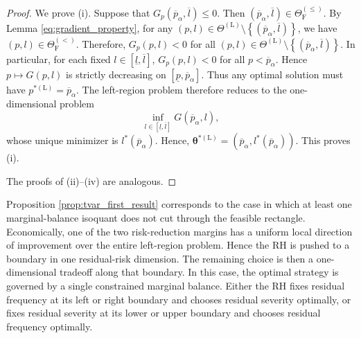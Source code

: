 \documentclass[a4paper,12pt]{article}
\begin{document}
\begin{proof}
We prove (i). Suppose that $G_p\left(\overline{p}_{\alpha},\overline{l}\right)\leq 0$. Then $\left(\overline{p}_{\alpha},\overline{l}\right)\in\Theta_{\text{F}}^{\left(\leq\right)}$. By Lemma \ref{eq:gradient_property}, for any $\left(p,l\right)\in\Theta^{\left(\text{L}\right)}\setminus\left\{\left(\overline{p}_{\alpha},\overline{l}\right)\right\}$, we have $\left(p,l\right)\in\Theta_{\text{F}}^{\left(<\right)}$. Therefore, $G_p\left(p,l\right)<0$ for all $\left(p,l\right)\in\Theta^{\left(\text{L}\right)}\setminus\left\{\left(\overline{p}_{\alpha},\overline{l}\right)\right\}$. In particular, for each fixed $l\in\left[\underline{l},\overline{l}\right]$, $G_p\left(p,l\right)<0$ for all $p<\overline{p}_{\alpha}$. Hence $p\mapsto G\left(p,l\right)$ is strictly decreasing on $\left[\underline{p},\overline{p}_{\alpha}\right]$. Thus any optimal solution must have $p^{*\left(\text{L}\right)}=\overline{p}_{\alpha}$. The left-region problem therefore reduces to the one-dimensional problem
\begin{equation*}
\inf_{l\in\left[\underline{l},\overline{l}\right]}G\left(\overline{p}_{\alpha},l\right),
\end{equation*}
whose unique minimizer is $l^*\left(\overline{p}_{\alpha}\right)$. Hence, ${\bm\theta}^{*\left(\text{L}\right)}=\left(\overline{p}_{\alpha},l^*\left(\overline{p}_{\alpha}\right)\right)$. This proves (i).

The proofs of (ii)--(iv) are analogous.
\end{proof}

Proposition \ref{prop:tvar_first_result} corresponds to the case in which at least one marginal-balance isoquant does not cut through the feasible rectangle. Economically, one of the two risk-reduction margins has a uniform local direction of improvement over the entire left-region problem. Hence the RH is pushed to a boundary in one residual-risk dimension. The remaining choice is then a one-dimensional tradeoff along that boundary. In this case, the optimal strategy is governed by a single constrained marginal balance. Either the RH fixes residual frequency at its left or right boundary and chooses residual severity optimally, or fixes residual severity at its lower or upper boundary and chooses residual frequency optimally.
\end{document}
